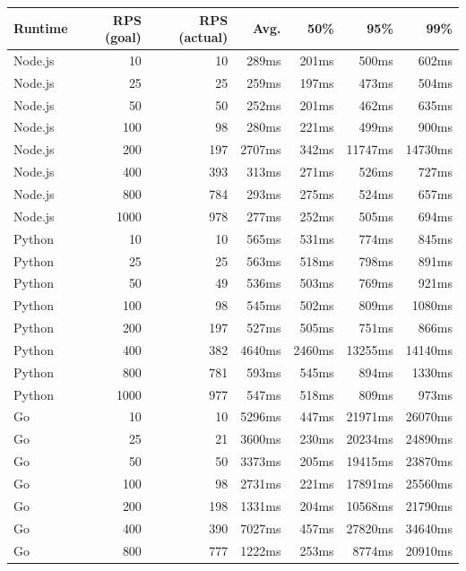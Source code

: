 \newpage
\begin{table}[h]
    \centering
    \begin{tabular}{|l|r|r|r|r|r|r|} \hline
    \textbf{Runtime} & \textbf{RPS (goal)} & \textbf{RPS (actual)} & \textbf{Avg.} & \textbf{50\%} & \textbf{95\%} & \textbf{99\%} \\ \hline
Node.js	&	10	&	10	&	289ms	&	201ms	&	500ms	&	602ms	\\ \hline
Node.js	&	25	&	25	&	259ms	&	197ms	&	473ms	&	504ms	\\ \hline
Node.js	&	50	&	50	&	252ms	&	201ms	&	462ms	&	635ms	\\ \hline
Node.js	&	100	&	98	&	280ms	&	221ms	&	499ms	&	900ms	\\ \hline
Node.js	&	200	&	197	&	2707ms	&	342ms	&	11747ms	&	14730ms	\\ \hline
Node.js	&	400	&	393	&	313ms	&	271ms	&	526ms	&	727ms	\\ \hline
Node.js	&	800	&	784	&	293ms	&	275ms	&	524ms	&	657ms	\\ \hline
Node.js	&	1000	&	978	&	277ms	&	252ms	&	505ms	&	694ms	\\ \hline
Python	&	10	&	10	&	565ms	&	531ms	&	774ms	&	845ms	\\ \hline
Python	&	25	&	25	&	563ms	&	518ms	&	798ms	&	891ms	\\ \hline
Python	&	50	&	49	&	536ms	&	503ms	&	769ms	&	921ms	\\ \hline
Python	&	100	&	98	&	545ms	&	502ms	&	809ms	&	1080ms	\\ \hline
Python	&	200	&	197	&	527ms	&	505ms	&	751ms	&	866ms	\\ \hline
Python	&	400	&	382	&	4640ms	&	2460ms	&	13255ms	&	14140ms	\\ \hline
Python	&	800	&	781	&	593ms	&	545ms	&	894ms	&	1330ms	\\ \hline
Python	&	1000	&	977	&	547ms	&	518ms	&	809ms	&	973ms	\\ \hline
Go	&	10	&	10	&	5296ms	&	447ms	&	21971ms	&	26070ms	\\ \hline
Go	&	25	&	21	&	3600ms	&	230ms	&	20234ms	&	24890ms	\\ \hline
Go	&	50	&	50	&	3373ms	&	205ms	&	19415ms	&	23870ms	\\ \hline
Go	&	100	&	98	&	2731ms	&	221ms	&	17891ms	&	25560ms	\\ \hline
Go	&	200	&	198	&	1331ms	&	204ms	&	10568ms	&	21790ms	\\ \hline
Go	&	400	&	390	&	7027ms	&	457ms	&	27820ms	&	34640ms	\\ \hline
Go	&	800	&	777	&	1222ms	&	253ms	&	8774ms	&	20910ms	\\ \hline

\end{tabular}
\end{table}

